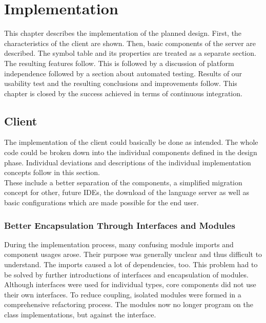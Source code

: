 \section{Implementation}
\label{chapter:implementation}
This chapter describes the implementation of the planned design.
First, the characteristics of the client are shown.
Then, basic components of the server are described.
The symbol table and its properties are treated as a separate section.
The resulting features follow.
This is followed by a discussion of platform independence followed by a section about automated testing.
Results of our usability test and the resulting conclusions and improvements follow.
This chapter is closed by the success achieved in terms of continuous integration.

\subsection{Client}
The implementation of the client could basically be done as intended.
The whole code could be broken down into the individual components defined in the design phase.
Individual deviations and descriptions of the individual implementation concepts follow in this section. \\

These include a better separation of the components,
a simplified migration concept for other, future IDEs,
the download of the language server
as well as basic configurations which are made possible for the end user.

\subsubsection{Better Encapsulation Through Interfaces and Modules}
\label{section:implementation:client:module_encapsulation}

During the implementation process, many confusing module imports and component usages arose.
Their purpose was generally unclear and thus difficult to understand.
The imports caused a lot of dependencies, too.
This problem had to be solved by further introductions of interfaces and encapsulation of modules. \\

Although interfaces were used for individual types,
core components did not use their own interfaces.
To reduce coupling, isolated modules were formed in a comprehensive refactoring process.
The modules now no longer program on the class implementations, but against the interface. \\

